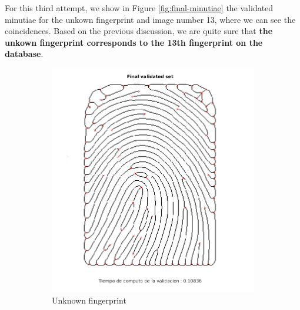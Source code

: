 \documentclass[11pt]{article}
\begin{document}
For this third attempt, we show in Figure \ref{fig:final-minutiae} the validated minutiae for the unkown fingerprint and image number 13, where we can see the coincidences. Based on the previous discussion, we are quite sure that \textbf{the unkown fingerprint corresponds to the 13th fingerprint on the database}.
\begin{figure}[h!]
  \centering
       \begin{subfigure}[t]{0.45\textwidth}
         \centering
         \includegraphics[scale=0.425]{img/unknown_3-7-3}
         \caption{Unknown fingerprint}
     \end{subfigure}%
     \quad
     \begin{subfigure}[t]{0.45\textwidth}
         \centering

\end{subfigure}
\end{figure}
\end{document}
